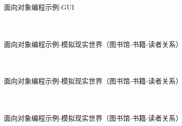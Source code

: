 \documentclass[UTF8,aspectratio=169]{beamer}
\begin{document}
\begin{frame}[fragile]{面向对象编程示例-GUI}
    \begin{columns}
        \begin{column}{0.48\textwidth}
            \inputminted[firstline=1,lastline=16]{cpp}{code/oop_example_gui.cpp}
        \end{column}
        \begin{column}{0.48\textwidth}
            \inputminted[firstline=17,lastline=32]{cpp}{code/oop_example_gui.cpp}
        \end{column}
    \end{columns}
\end{frame}

\begin{frame}[fragile]{面向对象编程示例-模拟现实世界（图书馆-书籍-读者关系）}
    \begin{columns}
        \begin{column}{0.48\textwidth}
            \inputminted[firstline=1,lastline=18]{cpp}{code/oop_example_real_world.cpp}
        \end{column}
        \begin{column}{0.48\textwidth}
            \inputminted[firstline=19,lastline=36]{cpp}{code/oop_example_real_world.cpp}
        \end{column}
    \end{columns}
\end{frame}

\begin{frame}[fragile]{面向对象编程示例-模拟现实世界（图书馆-书籍-读者关系）}
    \begin{columns}
        \begin{column}{0.48\textwidth}
            \inputminted[firstline=37,lastline=52]{cpp}{code/oop_example_real_world.cpp}
        \end{column}
        \begin{column}{0.48\textwidth}
            \inputminted[firstline=53,lastline=72]{cpp}{code/oop_example_real_world.cpp}
        \end{column}
    \end{columns}
\end{frame}

\begin{frame}[fragile]{面向对象编程示例-模拟现实世界（图书馆-书籍-读者关系）}
    \begin{columns}
        \begin{column}{0.48\textwidth}
            \inputminted[firstline=73,lastline=90]{cpp}{code/oop_example_real_world.cpp}
        \end{column}
        \begin{column}{0.48\textwidth}
            \inputminted[firstline=91,lastline=110]{cpp}{code/oop_example_real_world.cpp}
        \end{column}
    \end{columns}
\end{frame}
\end{document}
